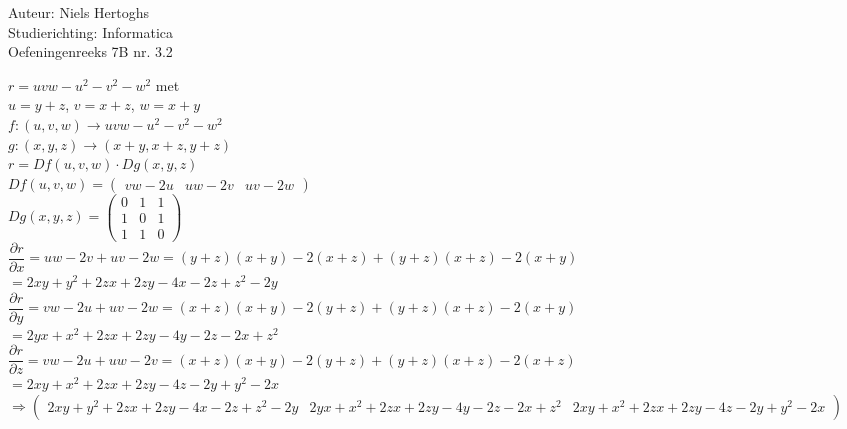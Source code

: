 \documentclass[a4paper]{article}
\begin{document}
\noindent \large Auteur: Niels Hertoghs \\
\noindent \large Studierichting: Informatica \\
\noindent \large Oefeningenreeks 7B nr. 3.2 \\

\medskip

\normalsize

$r = uvw-u^2-v^2-w^2$ met\\

$u = y+z$, $v = x+z$, $w = x+y$\\

$f:(u,v,w) \rightarrow uvw-u^2-v^2-w^2$ \\

$g:(x,y,z) \rightarrow (x+y,x+z,y+z)$ \\

$r = Df(u,v,w)\cdot Dg(x,y,z)$ \\

$Df(u,v,w) = \left(\begin{array}{ccc}
vw-2u & uw-2v & uv-2w 
\end{array}\right)$ \\

$Dg(x,y,z) = \left(\begin{array}{ccc}
0 & 1 & 1 \\
1 & 0 & 1 \\
1 & 1 & 0
\end{array}\right)$ \\

$\dfrac{\partial r}{\partial x} = uw-2v+uv-2w = (y+z)(x+y) - 2(x+z) + (y+z)(x+z) - 2(x+y)$ \\

$ = 2xy+y^2+2zx+2zy-4x-2z+z^2-2y$\\

$\dfrac{\partial r}{\partial y} = vw-2u+uv-2w = (x+z)(x+y)-2(y+z)+(y+z)(x+z)-2(x+y)$ \\

$ = 2yx+x^2+2zx+2zy-4y-2z-2x+z^2$\\

$\dfrac{\partial r}{\partial z} = vw-2u+uw-2v = (x+z)(x+y)-2(y+z)+(y+z)(x+z)-2(x+z)$ \\

$ = 2xy+x^2+2zx+2zy-4z-2y+y^2-2x$\\

$\Rightarrow \left(\begin{array}{ccc}
2xy+y^2+2zx+2zy-4x-2z+z^2-2y & 2yx+x^2+2zx+2zy-4y-2z-2x+z^2 & 2xy+x^2+2zx+2zy-4z-2y+y^2-2x
\end{array} \right)$\\

\begin{thebibliography}{999}
\end{thebibliography}
\end{document}
